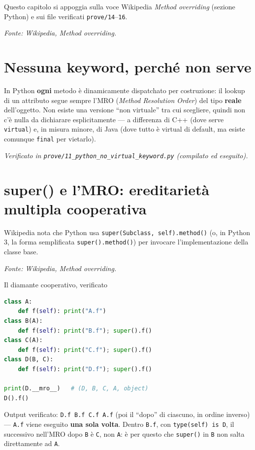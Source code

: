 \documentclass{report}
\newcommand{\code}[1]{\texttt{\small #1}}
\newcommand{\fontewiki}[1][Virtual function]{{\footnotesize\itshape\color{gray} Fonte: Wikipedia, \emph{#1}.\par}}
\newcommand{\fonteprove}[1]{{\footnotesize\itshape\color{gray} Verificato in \code{prove/#1} (compilato ed eseguito).\par}}
\begin{document}
Questo capitolo si appoggia sulla voce Wikipedia \emph{Method overriding}
(sezione Python) e sui file verificati \code{prove/14}--\code{16}.

\fontewiki[Method overriding]

\section{Nessuna keyword, perché non serve}

In Python \textbf{ogni} metodo è dinamicamente dispatchato per
costruzione: il lookup di un attributo segue sempre l'MRO (\emph{Method
Resolution Order}) del tipo \textbf{reale} dell'oggetto. Non esiste una
versione ``non virtuale'' tra cui scegliere, quindi non c'è nulla da
dichiarare esplicitamente --- a differenza di C++ (dove serve
\code{virtual}) e, in misura minore, di Java (dove tutto è virtual di
default, ma esiste comunque \code{final} per vietarlo).

\fonteprove{11\_python\_no\_virtual\_keyword.py}

\section{super() e l'MRO: ereditarietà multipla cooperativa}

Wikipedia nota che Python usa \code{super(Subclass, self).method()} (o,
in Python 3, la forma semplificata \code{super().method()}) per invocare
l'implementazione della classe base.

\fontewiki[Method overriding]


\begin{Example}{Il diamante cooperativo, verificato}{}
\begin{lstlisting}[language=Python]
class A:
    def f(self): print("A.f")
class B(A):
    def f(self): print("B.f"); super().f()
class C(A):
    def f(self): print("C.f"); super().f()
class D(B, C):
    def f(self): print("D.f"); super().f()

print(D.__mro__)   # (D, B, C, A, object)
D().f()
\end{lstlisting}
Output verificato: \code{D.f B.f C.f A.f} (poi il ``dopo'' di ciascuno, in
ordine inverso) --- \code{A.f} viene eseguito \textbf{una sola volta}.
Dentro \code{B.f}, con \code{type(self) is D}, il successivo nell'MRO
dopo \code{B} è \code{C}, non \code{A}: è per questo che \code{super()} in
\code{B} non salta direttamente ad \code{A}.
\end{Example}
\end{document}
